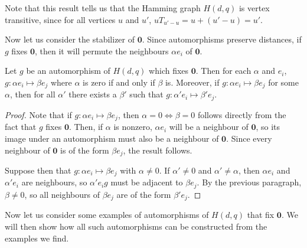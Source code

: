 \documentclass{report}
\newcommand{\vzero}{\mathbf{0}}
\begin{document}
    Note that this result tells us that the Hamming graph $H(d, q)$ is vertex
    transitive, since for all vertices $u$ and $u'$, $u T_{u' - u} = u + (u' -
    u) = u'$.

    Now let us consider the stabilizer of $\vzero$.  Since automorphisms
    preserve distances, if $g$ fixes $\vzero$, then it will permute the
    neighbours $\alpha e_i$ of $\vzero$.

    \begin{lem}\label{lem:hamming-automorphisms-preserve-component}
      Let $g$ be an automorphism  of $H(d, q)$ which fixes $\vzero$.  Then for
      each $\alpha$ and $e_i$, $g: \alpha e_i \mapsto \beta e_j$ where $\alpha$
      is zero if and only if $\beta$ is.
      Moreover, if $g: \alpha e_i \mapsto \beta e_j$ for some $\alpha$, then for
      all $\alpha'$ there exists a $\beta'$ such that $g: \alpha' e_i \mapsto
      \beta' e_j$.
    \end{lem}

    \begin{proof}
      Note that if $g: \alpha e_i \mapsto \beta e_j$, then $\alpha = 0 \iff \beta
      = 0$ follows directly from the fact that $g$ fixes $\vzero$.  Then, if
      $\alpha$ is nonzero, $\alpha e_i$ will be a neighbour of $\vzero$, so its
      image under an automorphism must also be a neighbour of $\vzero$.  Since
      every neighbour of $\vzero$ is of the form $\beta e_j$, the result
      follows.

      Suppose then that $g: \alpha e_i \mapsto \beta e_j$ with $\alpha \neq 0$.
      If $\alpha' \neq 0$ and $\alpha' \neq \alpha$, then $\alpha e_i$ and
      $\alpha' e_i$ are neighbours, so $\alpha' e_i g$ must be adjacent to
      $\beta e_j$.  By the previous paragraph, $\beta \neq 0$, so all neighbours
      of $\beta e_j$ are of the form $\beta' e_j$.
    \end{proof}

    Now let us consider some examples of automorphisms of $H(d, q)$ that fix
    $\vzero$.  We will then show how all such automorphisms can be constructed
    from the examples we find.
\end{document}
